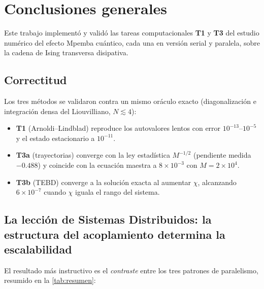 \chapter{Conclusiones generales}
\label{ch:conclusiones}

Este trabajo implementó y validó las tareas computacionales \textbf{T1} y
\textbf{T3} del estudio numérico del efecto Mpemba cuántico, cada una en versión
serial y paralela, sobre la cadena de Ising transversa disipativa.


\section*{Correctitud}

Los tres métodos se validaron contra un mismo oráculo exacto (diagonalización e
integración densa del Liouvilliano, $N\lesssim4$):
\begin{itemize}
  \item \textbf{T1} (Arnoldi--Lindblad) reproduce los autovalores lentos con error
  $10^{-13}$--$10^{-5}$ y el estado estacionario a $10^{-11}$.
  \item \textbf{T3a} (trayectorias) converge con la ley estadística $M^{-1/2}$
  (pendiente medida $-0.488$) y coincide con la ecuación maestra a $8\times10^{-3}$
  con $M=2\times10^4$.
  \item \textbf{T3b} (TEBD) converge a la solución exacta al aumentar $\chi$,
  alcanzando $6\times10^{-7}$ cuando $\chi$ iguala el rango del sistema.
\end{itemize}

\section*{La lección de Sistemas Distribuidos: la estructura del acoplamiento
determina la escalabilidad}

El resultado más instructivo es el \emph{contraste} entre los tres patrones de
paralelismo, resumido en la \cref{tab:resumen}:

